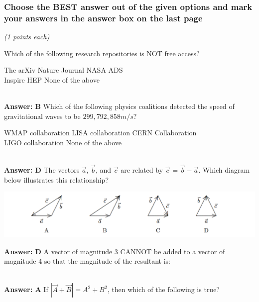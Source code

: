 \documentclass[12pt,addpoints]{exam}
\begin{document}
{{{				\subsubsection*{Choose the BEST answer out of the given options and mark your answers in the answer box on the last page}\textit{(1 points each)} 
				\begin{questions}
					\question Which of the following research repositories is NOT free access? \\
					\begin{oneparchoices}
						\choice The arXiv
						\choice Nature Journal
						\choice NASA ADS \\
						\choice Inspire HEP
						\choice None of the above
					\end{oneparchoices}	\\
					\textbf{Answer: B}
					\question Which of the following physics coalitions detected the speed of gravitational waves to be $299,792,858m/s$? \\
					\begin{oneparchoices}
						\choice WMAP collaboration
						\choice LISA collaboration 
						\choice CERN Collaboration \\
						\choice LIGO collaboration
						\choice None of the above
					\end{oneparchoices}\\
					\textbf{Answer: D}
					\question  The vectors $\vec{a}$, $\vec{b}$, and $\vec{c}$ are related by $\vec{c}$ = $\vec{b}-\vec{a}$. Which diagram below illustrates this
					relationship?
					\begin{center}
						\includegraphics[scale=0.4]{vecs.png}
					\end{center}
					\textbf{Answer: D}
					\question A vector of magnitude 3 CANNOT be added to a vector of magnitude 4 so that the magnitude of the resultant is:\\
					\begin{oneparchoices}
						\choice 0
						\choice 1
						\choice 3
						\choice 7
						\choice 5
					\end{oneparchoices}
					\\
					\textbf{Answer: A}
					\question If $|\vec{A}+\vec{B}|=A^2+B^2$, then which of the following is true?

\end{questions}}}}
\end{document}
